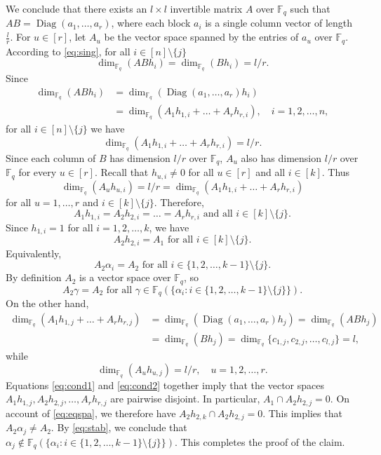\documentclass[11pt,onecolumn]{IEEEtran}
\DeclareMathOperator{\Diag}{Diag}
\begin{document}
We conclude that there exists an $l \times l$ invertible matrix $A$ over $\mathbb{F}_q$ such that  $AB=\Diag(a_1,\dots,a_r)$, where each block $a_i$ is a single column vector of length $\frac{l}{r}$.
For $u\in[r]$, let $A_u$ be the vector space spanned by the entries of $a_u$ over $\mathbb{F}_q$.
According to \eqref{eq:sing}, for all $i\in[n]\setminus\{j\}$
$$
\dim_{\mathbb{F}_q}(ABh_i)=\dim_{\mathbb{F}_q}(Bh_i)=l/r.
$$
Since 
\begin{align*}
\dim_{\mathbb{F}_q}(ABh_i)&=\dim_{\mathbb{F}_q}(\Diag(a_1,\dots,a_r) h_i)\\
&=
\dim_{\mathbb{F}_q}(A_1h_{1,i}+\dots+ A_r h_{r,i}), \quad i=1,2,\dots,n,
\end{align*}
for all $i\in[n]\setminus\{j\}$ we have 
$$
\dim_{\mathbb{F}_q}(A_1h_{1,i}+\dots+ A_r h_{r,i}) =l/r.
$$
Since each column of $B$ has dimension $l/r$ over $\mathbb{F}_q$,
$A_u$ also has dimension $l/r$ over $\mathbb{F}_q$ for every $u\in[r]$.
Recall that $h_{u,i}\neq 0$ for all $u\in[r]$ and all $i\in[k]$.
Thus
$$
\dim_{\mathbb{F}_q}(A_u h_{u,i})=l/r
= \dim_{\mathbb{F}_q}(A_1h_{1,i}+\dots+ A_r h_{r,i})
$$
for all  $u=1,\dots,r$ and $i\in[k]\setminus\{j\}.$
Therefore,
$$
A_1 h_{1,i}=A_2 h_{2,i} = \dots = A_r h_{r,i} \text{~and all~} i\in[k]\setminus\{j\}.
$$
Since $h_{1,i}=1$ for all $i=1,2,\dots,k$, we have
\begin{equation}\label{eq:eqspa}
A_2 h_{2,i} = A_1 \text{~for all~} i\in[k]\setminus\{j\}.
\end{equation}
Equivalently,
$$
A_2 \alpha_i = A_2 \text{~for all~} i\in\{1,2,\dots,k-1\} \setminus\{j\}.
$$
By definition $A_2$ is a vector space over $\mathbb{F}_q$, so 
\begin{equation}\label{eq:stab}
A_2 \gamma = A_2 \text{~for all~} 
\gamma \in \mathbb{F}_q(\{\alpha_i: i\in\{1,2,\dots,k-1\} \setminus\{j\}\}).
\end{equation}
On the other hand,
\begin{equation}\label{eq:cond1}
\begin{aligned}
\dim_{\mathbb{F}_q}(A_1h_{1,j}+\dots+ A_r h_{r,j}) & =\dim_{\mathbb{F}_q}(\Diag(a_1,\dots,a_r) h_j)=
\dim_{\mathbb{F}_q}(ABh_j)\\
& = \dim_{\mathbb{F}_q}(Bh_j) = 
\dim_{\mathbb{F}_q}\{c_{1,j},c_{2,j},\dots,c_{l,j}\}= l,
\end{aligned}
\end{equation}
while
\begin{equation}\label{eq:cond2}
\dim_{\mathbb{F}_q}(A_u h_{u,j})=l/r, \quad  u=1,2,\dots,r.
\end{equation}
Equations \eqref{eq:cond1} and \eqref{eq:cond2} together imply that the vector spaces $A_1 h_{1,j}, A_2 h_{2,j}, \dots, A_r h_{r,j}$ are pairwise disjoint. In particular, $A_1 \cap A_2 h_{2,j} = {0}.$ On account of
\eqref{eq:eqspa}, we therefore have $A_2 h_{2,k} \cap A_2 h_{2,j} = {0}.$
This implies that $A_2 \alpha_j \neq A_2$. By \eqref{eq:stab}, we conclude that
$\alpha_j \notin \mathbb{F}_q(\{\alpha_i: i\in\{1,2,\dots,k-1\} \setminus\{j\}\})$.
This completes the proof of the claim.
\end{document}

